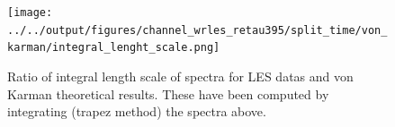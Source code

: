 \documentclass[]{article}
\theoremstyle{plain}
\theoremstyle{remark}
\begin{document}
\begin{figure}[H]
	\begin{center}
		\texttt{[image: ../../output/figures/channel\_wrles\_retau395/split\_time/von\_karman/integral\_lenght\_scale.png]}
		\caption{Ratio of integral length scale of spectra for LES datas and von Karman theoretical results. These have been computed by integrating (trapez method) the spectra above.}
	\end{center}
\end{figure}
	
	
\end{document}

